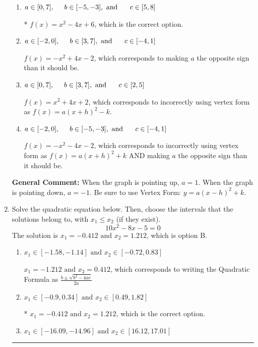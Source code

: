 \documentclass{extbook}[14pt]
\newcommand{\litem}[1]{\item #1

\rule{\textwidth}{0.4pt}}
\begin{document}
\begin{enumerate}
{\begin{enumerate}[label=\Alph*.]
$f(x)=x^{2} +4 x + 6$, which corresponds to incorrectly using vertex form as $f(x) = a(x+h)^2+k$.
\item \( a \in [0, 7], \hspace*{5mm} b \in [-5, -3], \text{ and } \hspace*{5mm} c \in [5, 8] \)

* $f(x)=x^{2} -4 x + 6$, which is the correct option.
\item \( a \in [-2, 0], \hspace*{5mm} b \in [3, 7], \text{ and } \hspace*{5mm} c \in [-4, 1] \)

$f(x)=-x^{2} +4 x -2$, which corresponds to making $a$ the opposite sign than it should be.
\item \( a \in [0, 7], \hspace*{5mm} b \in [3, 7], \text{ and } \hspace*{5mm} c \in [2, 5] \)

$f(x)=x^{2} +4 x + 2$, which corresponds to incorrectly using vertex form as $f(x) = a(x+h)^2 - k$.
\item \( a \in [-2, 0], \hspace*{5mm} b \in [-5, -3], \text{ and } \hspace*{5mm} c \in [-4, 1] \)

$f(x)=-x^{2} -4 x -2$, which corresponds to incorrectly using vertex form as $f(x) = a(x+h)^2+k$ AND making $a$ the opposite sign than it should be.
\end{enumerate}

\textbf{General Comment:} When the graph is pointing up, $a=1$. When the graph is pointing down, $a=-1$. Be sure to use Vertex Form: $y = a(x-h)^2+k$.
}
\litem{
Solve the quadratic equation below. Then, choose the intervals that the solutions belong to, with $x_1 \leq x_2$ (if they exist).
\[ 10x^{2} -8 x -5 = 0 \]The solution is \( x_1 = -0.412 \text{ and } x_2 = 1.212 \), which is option B.\begin{enumerate}[label=\Alph*.]
\item \( x_1 \in [-1.58, -1.14] \text{ and } x_2 \in [-0.72, 0.83] \)

 $x_1 = -1.212 \text{ and } x_2 = 0.412$, which corresponds to writing the Quadratic Formula as $\frac{b \pm \sqrt{b^2 - 4ac}}{2a}$
\item \( x_1 \in [-0.9, 0.34] \text{ and } x_2 \in [0.49, 1.82] \)

* $x_1 = -0.412 \text{ and } x_2 = 1.212$, which is the correct option.
\item \( x_1 \in [-16.09, -14.96] \text{ and } x_2 \in [16.12, 17.01] \)


\end{enumerate}}
\end{enumerate}
\end{document}

